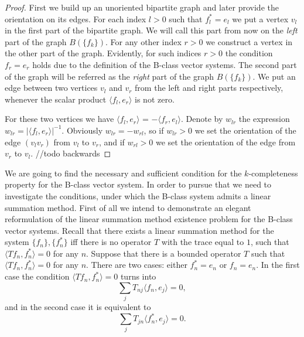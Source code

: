 \documentclass[12pt]{article}
\theoremstyle{definition}
\numberwithin{remark}{section}
\numberwithin{theorem}{section}
\numberwithin{prop}{section}
\numberwithin{equation}{section}
\numberwithin{lemma}{section}
\numberwithin{prop_under_lemma}{lemma}
\begin{document}
    \begin{proof}
        First we build up an unoriented bipartite graph and later provide the orientation on its edges.
        For each index $l > 0$ such that $f^*_l = e_l$ we put a vertex $v_l$ in the first part of the bipartite graph.
        We will call this part from now on the \textit{left} part of the graph $B(\{f_k\})$.
        For any other index $r > 0$ we construct a vertex in the other part of the graph.
        Evidently, for such indices $r > 0$ the condition $f_r = e_r$ holds due to the definition of the B-class vector systems.
        The second part of the graph will be referred as the \textit{right} part of the graph $B(\{f_k\})$.
        We put an edge between two vertices $v_l$ and $v_r$ from the left and right parts respectively,
        whenever the scalar product $\langle f_l, e_r \rangle$ is not zero.
        
        For these two vertices we have $\langle f_l, e_r \rangle$ = $-\langle f_r, e_l \rangle$.
        Denote by $w_{lr}$ the expression $w_{lr} = \left|\langle f_l, e_r \rangle\right|^{-1}$.
        Obviously $w_{lr} = -w_{rl}$, so if $w_{lr} > 0$ we set the orientation of the edge $(v_l v_r)$ from $v_l$
        to $v_r$, and if $w_{rl} > 0$ we set the orientation of the edge from $v_r$ to $v_l$.
        //todo backwards
    \end{proof}
    We are going to find the necessary and sufficient condition for the $k$-completeness property for the B-class vector system. In order to pursue that
    we need to investigate the conditions, under which the B-class system admits a linear summation method.
    First of all we intend to demonstrate an elegant reformulation of the linear summation method existence problem for
    the B-class vector systems.
    Recall that there exists a linear summation method for the system $\{f_n\}, \{f^*_n\}$
    iff there is no operator $T$ with the trace equal to $1$, such that $\langle Tf_n, f_n^*\rangle = 0$ for any $n$.
    Suppose that there is a bounded operator $T$ such that $\langle Tf_n, f_n^*\rangle = 0$ for any $n$.
    There are two cases: either $f^*_n = e_n$ or $f_n = e_n$.
    In the first case the condition $\langle Tf_n, f_n^*\rangle = 0$ turns into
    \begin{equation}
        \label{left-eqn}
        \sum_j T_{nj} \langle f_n, e_j \rangle = 0,
    \end{equation}
    and in the second case it is equivalent to 
    \begin{equation}
        \label{right-eqn}
        \sum_j T_{jn} \langle f^*_n, e_j \rangle = 0.
    \end{equation}
\end{document}
